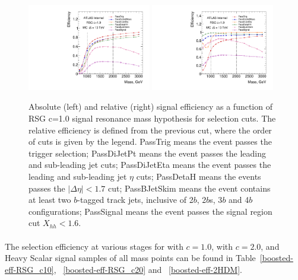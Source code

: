 \begin{figure}
\begin{center}
\includegraphics[width=0.48\textwidth,angle=-90]{figures/boosted/SigEff/evtsel_Moriond_Efficiency_PreSel.pdf}
\includegraphics[width=0.48\textwidth,angle=-90]{figures/boosted/SigEff/evtsel_Moriond_Efficiency_PreSel_rel.pdf}
  \caption{Absolute (left) and relative (right) signal efficiency as a function of RSG c=1.0 signal resonance mass hypothesis for selection cuts. The relative efficiency is defined from the previous cut, where the order of cuts is given by the legend. PassTrig means the event passes the trigger selection; PassDiJetPt means the event passes the leading and sub-leading jet \pt cuts; PassDiJetEta means the event passes the leading and sub-leading jet $\eta$ cuts; PassDetaH means the events passes the $|\Delta \eta| < 1.7$ cut; PassBJetSkim means the event contains at least two $b$-tagged track jets, inclusive of 2$b$, 2$b$s, 3$b$ and 4$b$ configurations; PassSignal means the event passes the signal region cut $X_{hh} < 1.6$.}
  \label{fig:boosted-selection-efficiency}
\end{center}
\end{figure}

\paragraph{}
The selection efficiency at various stages for \Grav with $c=1.0$, \Grav with $c=2.0$, and Heavy Scalar signal samples of all mass points can be found in Table~\ref{boosted-eff-RSG_c10}, ~\ref{boosted-eff-RSG_c20} and ~\ref{boosted-eff-2HDM}.


